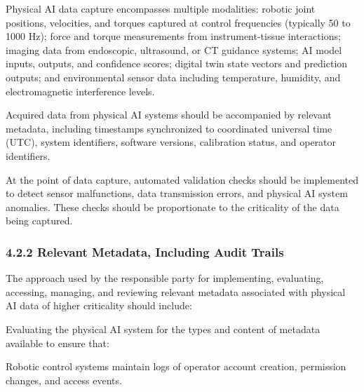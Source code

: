 \documentclass[11pt]{article}
\begin{document}
\begin{description}[leftmargin=2.5cm,style=sameline]

\item[(a)] Physical AI data capture encompasses multiple modalities: robotic joint positions, velocities, and torques captured at control frequencies (typically 50 to 1000 Hz); force and torque measurements from instrument-tissue interactions; imaging data from endoscopic, ultrasound, or CT guidance systems; AI model inputs, outputs, and confidence scores; digital twin state vectors and prediction outputs; and environmental sensor data including temperature, humidity, and electromagnetic interference levels.

\item[(b)] Acquired data from physical AI systems should be accompanied by relevant metadata, including timestamps synchronized to coordinated universal time (UTC), system identifiers, software versions, calibration status, and operator identifiers.

\item[(c)] At the point of data capture, automated validation checks should be implemented to detect sensor malfunctions, data transmission errors, and physical AI system anomalies. These checks should be proportionate to the criticality of the data being captured.

\end{description}

\subsubsection{4.2.2 Relevant Metadata, Including Audit Trails}

The approach used by the responsible party for implementing, evaluating, accessing, managing, and reviewing relevant metadata associated with physical AI data of higher criticality should include:

\begin{description}[leftmargin=2.5cm,style=sameline]

\item[(a)] Evaluating the physical AI system for the types and content of metadata available to ensure that:

\item[(i)] Robotic control systems maintain logs of operator account creation, permission changes, and access events.

\end{description}
\end{document}
